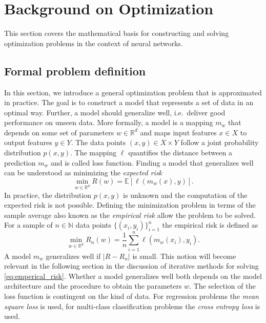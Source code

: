 \documentclass[12pt]{article}
\theoremstyle{definition}
\numberwithin{equation}{section}
\newcommand{\ev}[1]{\mathbb{E}\left[{#1}\right]}
\begin{document}
\section{Background on Optimization}
\label{sec:Optimization}
 This section covers the mathematical basis for constructing and solving optimization problems in the context of neural networks.

\subsection{Formal problem definition}
In this section, we introduce a general optimization problem that is approximated in practice. The goal is to construct a model that represents a set of data in an optimal way. Further, a model should generalize well, i.e.\ deliver good performance on unseen data. More formally, a model is a mapping $m_w$ that depends on some set of parameters $w \in \mathbb{R}^d$ and maps input features $x \in X$ to output features $y \in Y$. The data points $(x,y) \in X \times Y$ follow a joint probability distribution $p(x,y)$. The mapping $\ell$ quantifies the distance between a prediction $m_{w}$ and is called loss function. Finding a model that generalizes well can be understood as minimizing the \emph{expected risk}
\begin{equation}
  \min_{w \in \mathbb{R}^d} R(w) = \ev{\ell(m_{w}(x),y)}.
\end{equation}
In practice, the distribution $p(x,y)$ is unknown and the computation of the expected risk is not possible. Defining the minimization problem in terms of the sample average also known as the \emph{empirical risk} allow the problem to be solved. For a sample of $n \in \mathbb{N}$ data points $\{(x_i, y_i)\}_{i=1}^n$ the empirical risk is defined as 
\begin{equation}
  \label{eq:emperical_risk}
  \min_{w \in \mathbb{R}^d}  R_n(w) = \frac{1}{n}\sum_{i=1}^n\ell(m_{w}(x_i),y_i).
\end{equation}
A model $m_{w}$ generalizes well if $|R - R_n|$ is small. This notion will become relevant in the following section in the discussion of iterative methods for solving \eqref{eq:emperical_risk}. Whether a model generalizes well both depends on the model architecture and the procedure to obtain the parameters $w$. 
The selection of the loss function is contingent on the kind of data. For regression problems the \emph{mean square loss} is used, for multi-class classification problems the \emph{cross entropy loss} is used.
\end{document}
